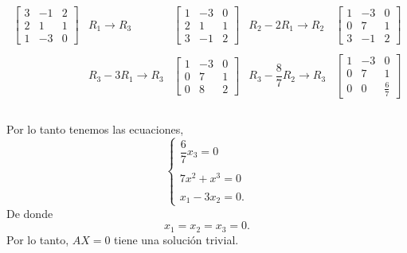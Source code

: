 \begin{enumerate}[\bfseries 1.]
	$$\begin{array}{ccccc}

	    \left[\begin{array}{rrr}
		3 & -1 & 2 \\
		2 & 1 & 1 \\
		1 & -3 & 0
	    \end{array}\right]
	    &R_1 \to R_3 &
	    \left[\begin{array}{rrr}
		1 & -3 & 0\\
		2 & 1 & 1 \\
		3 & -1 & 2 
	    \end{array}\right]
	    &R_2-2R_1 \to R_2&
	    \left[\begin{array}{rrr}
		1 & -3 & 0\\
		0 & 7 & 1 \\
		3 & -1 & 2 
	    \end{array}\right]\\\\
	    &R_3-3R_1\to R_3&
	    \left[\begin{array}{rrr}
		1 & -3 & 0\\
		0 & 7 & 1 \\
		0 & 8 & 2 
	    \end{array}\right]
	    &R_3-\dfrac{8}{7} R_2 \to R_3&
	    \left[\begin{array}{*{3}{r}}
		1 & -3 & 0\\
		0 & 7 & 1 \\
		0 & 0 & \frac{6}{7} 
	    \end{array}\right]\\\\

	\end{array}$$

	Por lo tanto tenemos las ecuaciones,
	$$\left\{\begin{array}{rcl}
	    \dfrac{6}{7}x_3=0\\\\
	    7x^2+x^3=0\\\\
	    x_1-3x_2=0. 
	\end{array}\right.$$
	De donde 
	$$x_1=x_2=x_3=0.$$
	Por lo tanto, $AX=0$ tiene una solución trivial.\\\\



\end{enumerate}
